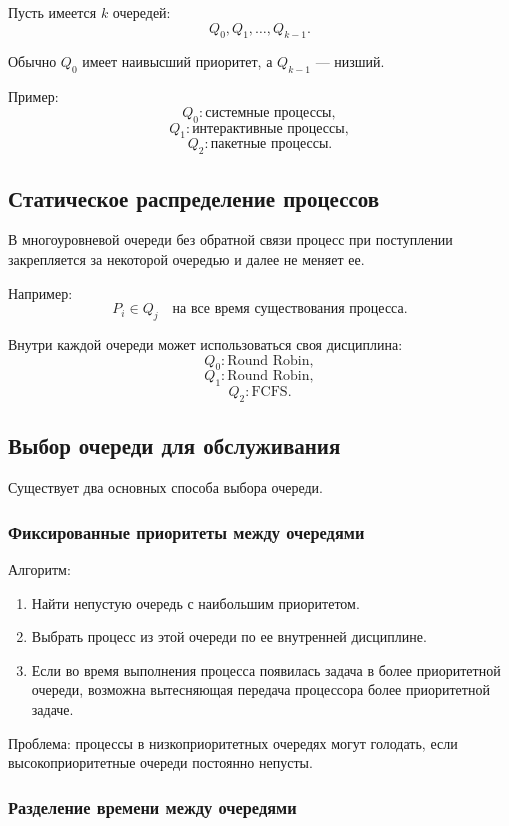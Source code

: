 \documentclass[12pt,a4paper]{article}
\begin{document}
Пусть имеется $k$ очередей:
\[
Q_0,Q_1,\ldots,Q_{k-1}.
\]

Обычно $Q_0$ имеет наивысший приоритет, а $Q_{k-1}$ --- низший.

Пример:
\[
Q_0: \text{системные процессы},
\]
\[
Q_1: \text{интерактивные процессы},
\]
\[
Q_2: \text{пакетные процессы}.
\]

\subsection{Статическое распределение процессов}

В многоуровневой очереди без обратной связи процесс при поступлении закрепляется за некоторой очередью и далее не меняет ее.

Например:
\[
P_i \in Q_j \quad \text{на все время существования процесса}.
\]

Внутри каждой очереди может использоваться своя дисциплина:
\[
Q_0: \text{Round Robin},
\]
\[
Q_1: \text{Round Robin},
\]
\[
Q_2: \text{FCFS}.
\]

\subsection{Выбор очереди для обслуживания}

Существует два основных способа выбора очереди.

\subsubsection{Фиксированные приоритеты между очередями}

Алгоритм:
\begin{enumerate}
    \item Найти непустую очередь с наибольшим приоритетом.
    \item Выбрать процесс из этой очереди по ее внутренней дисциплине.
    \item Если во время выполнения процесса появилась задача в более приоритетной очереди, возможна вытесняющая передача процессора более приоритетной задаче.
\end{enumerate}

Проблема: процессы в низкоприоритетных очередях могут голодать, если высокоприоритетные очереди постоянно непусты.

\subsubsection{Разделение времени между очередями}
\end{document}
